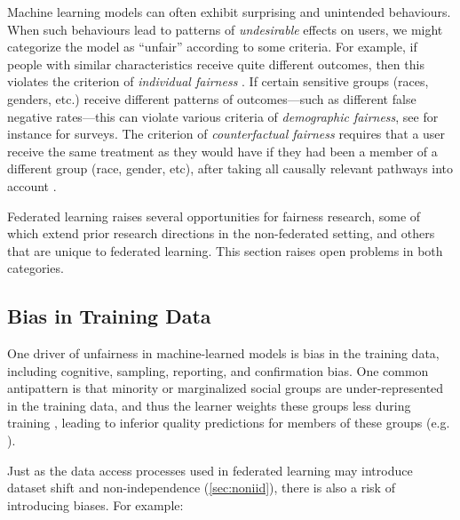 \documentclass[11pt]{article}
\begin{document}
Machine learning models can often exhibit surprising and unintended behaviours. When such behaviours lead to patterns of {\em undesirable} effects on users, we might categorize the model as ``unfair'' according to some criteria. For example, if people with similar characteristics receive quite different outcomes, then this violates the criterion of {\em individual fairness} \cite{dwork2012fairness}. If certain sensitive groups (races, genders, etc.) receive different patterns of outcomes---such as different false negative rates---this can violate various criteria of {\em demographic fairness}, see for instance \cite{barocasfairness, mitchell2018prediction} for surveys. The criterion of {\em counterfactual fairness} requires that a user  receive the same treatment as they would have if they had been a member of a different group (race, gender, etc), after taking all causally relevant pathways into account \cite{kusner2017counterfactual}.

Federated learning raises several opportunities for fairness research, some of which extend prior research directions in the non-federated setting, and others that are unique to federated learning. This section raises open problems in both categories.

\subsection{Bias in Training Data}\label{subsec:bias-in-training-data}

One driver of unfairness in machine-learned models is bias in the training data, including cognitive, sampling, reporting, and confirmation bias. One common antipattern is that minority or marginalized social groups are under-represented in the training data, and thus the learner weights these groups less during training \cite{kamishima2011fairness}, leading to inferior quality predictions for members of these groups (e.g. \cite{buolamwini2018gender}).

Just as the data access processes used in federated learning may introduce dataset shift and non-independence (\cref{sec:noniid}), there is also a risk of introducing biases. For example:
\end{document}
